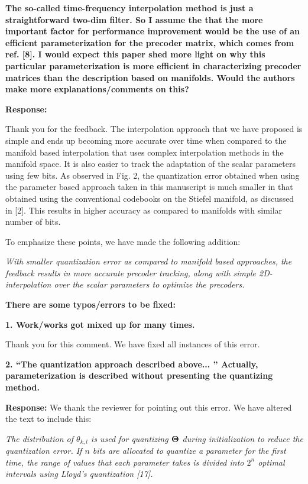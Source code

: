 \documentclass[12pt]{letter}
\begin{document}
\textbf{ The so-called time-frequency interpolation method is just a
  straightforward two-dim filter. So I assume the that the more
  important factor for performance improvement would be the use of an
  efficient parameterization for the precoder matrix, which comes from
  ref. [8]. I would expect this paper shed more light on why this
  particular parameterization is more efficient in characterizing
  precoder matrices than the description based on manifolds.  Would
  the authors make more explanations/comments on this?}

\textbf{Response:}

Thank you for the feedback. The interpolation approach that we have
proposed is simple and ends up becoming more accurate over time when
compared to the manifold based interpolation that uses complex
interpolation methods in the manifold space. It is also easier to
track the adaptation of the scalar parameters using few bits. As
observed in Fig. 2, the quantization error obtained when using the
parameter based approach taken in this manuscript is much smaller in
that obtained using the conventional codebooks on the Stiefel
manifold, as discussed in [2]. This results in higher accuracy as
compared to manifolds with similar number of bits.

To emphasize these points, we have made the following addition:

\emph{With smaller
quantization error as compared to manifold based approaches, the
feedback results in more accurate precoder tracking, along with simple
2D-interpolation over the scalar parameters to optimize the precoders.}

\textbf{There are some typos/errors to be fixed:}

\textbf{1. Work/works got mixed up for many times.}

Thank you for this comment. We have fixed all instances of this error.

\textbf{2. ``The quantization approach described above... '' Actually,
  parameterization is described without presenting the quantizing
  method.}

\textbf{Response:} We thank the reviewer for pointing out this
error. We have altered the text to include this:

\emph{The distribution of $\theta_{k,l}$ is used for
quantizing $\bf{\Theta}$ during initialization to reduce the
quantization error.  If $n$ bits are allocated to quantize a
parameter for the first time, the range of values that each parameter
takes is divided into $2^n$ optimal intervals using Lloyd's
quantization [17].}
\end{document}
